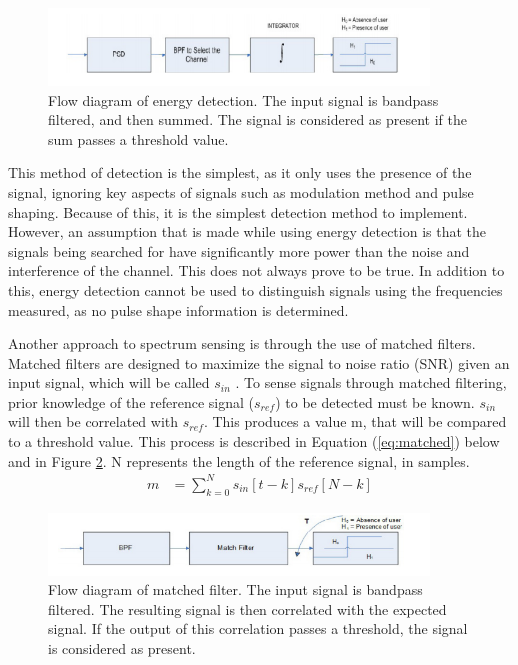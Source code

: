 \begin{figure}[ht]
\centering
\includegraphics[width=0.90\textwidth]{img/energy_detection.png}
\caption{Flow diagram of energy detection. The input signal is bandpass filtered, and then summed. The signal is considered as present if the sum passes a threshold value.}
\label{fig:energy_detection}
\end{figure}\par

This method of detection is the simplest, as it only uses the presence of the signal, ignoring key aspects of signals such as modulation method and pulse shaping. Because of this, it is the simplest detection method to implement. However, an assumption that is made while using energy detection is that the signals being searched for have significantly more power than the noise and interference of the channel. This does not always prove to be true. In addition to this, energy detection cannot be used to distinguish signals using the frequencies measured, as no pulse shape information is determined.\par
Another approach to spectrum sensing is through the use of matched filters. Matched filters are designed to maximize the signal to noise ratio (SNR) given an input signal, which will be called $s_{in}$ \cite{sensing_energy}. To sense signals through matched filtering, prior knowledge of the reference signal ($s_{ref}$) to be detected must be known. $s_{in}$ will then be correlated with $s_{ref}$. This produces a value m, that will be compared to a threshold value. This process is described in Equation (\ref{eq:matched}) below and in Figure \ref{figure:matched_filter}. N represents the length of the reference signal, in samples. 
\begin{align} \label{eq:matched}
    m &= \sum_{k = 0}^{N}s_{in}[t-k]s_{ref}[N-k] 
\end{align}
\begin{figure}[ht]
\centering
\includegraphics[width=0.90\textwidth]{img/match_filter.png}
\caption{Flow diagram of matched filter. The input signal is bandpass filtered. The resulting signal is then correlated with the expected signal. If the output of this correlation passes a threshold, the signal is considered as present.}
\label{figure:matched_filter}
\end{figure}\par
